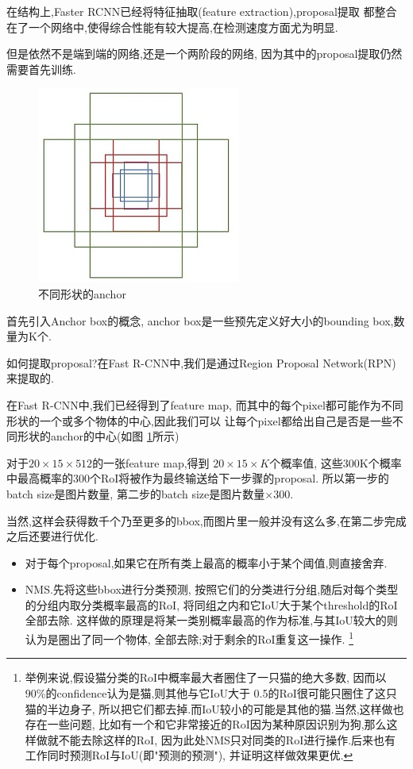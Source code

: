 在结构上,Faster RCNN已经将特征抽取(feature extraction),proposal提取
都整合在了一个网络中,使得综合性能有较大提高,在检测速度方面尤为明显.

但是依然不是端到端的网络,还是一个两阶段的网络, 因为其中的proposal提取仍然需要首先训练.

\begin{figure}[htbp]
    \centering
    \includegraphics[scale=0.7]{figures/anchor.jpg}
    \caption{不同形状的anchor}
    \label{fig:anchor}
\end{figure}

首先引入Anchor box的概念, anchor box是一些预先定义好大小的bounding box,数量为K个.

如何提取proposal?在Fast R-CNN中,我们是通过Region Proposal Network(RPN)来提取的.

在Fast R-CNN中,我们已经得到了feature map,
而其中的每个pixel都可能作为不同形状的一个或多个物体的中心,因此我们可以
让每个pixel都给出自己是否是一些不同形状的anchor的中心(如图 \ref{fig:anchor}所示)

对于$20\times 15\times 512$的一张feature map,得到 $20\times 15\times K$个概率值,
这些300K个概率中最高概率的300个RoI将被作为最终输送给下一步骤的proposal.
所以第一步的batch size是图片数量, 第二步的batch size是图片数量$\times$300.


当然,这样会获得数千个乃至更多的bbox,而图片里一般并没有这么多,在第二步完成之后还要进行优化.

\begin{itemize}
    \item 对于每个proposal,如果它在所有类上最高的概率小于某个阈值,则直接舍弃.
    \item NMS.先将这些bbox进行分类预测,
按照它们的分类进行分组,随后对每个类型的分组内取分类概率最高的RoI,
将同组之内和它IoU大于某个threshold的RoI全部去除.
这样做的原理是将某一类别概率最高的作为标准,与其IoU较大的则认为是圈出了同一个物体,
全部去除;对于剩余的RoI重复这一操作.
\footnote{举例来说,假设猫分类的RoI中概率最大者圈住了一只猫的绝大多数,
因而以90\%的confidence认为是猫,则其他与它IoU大于
0.5的RoI很可能只圈住了这只猫的半边身子,
所以把它们都去掉.而IoU较小的可能是其他的猫.当然,这样做也存在一些问题,
比如有一个和它非常接近的RoI因为某种原因识别为狗,那么这样做就不能去除这样的RoI,
因为此处NMS只对同类的RoI进行操作.后来也有工作同时预测RoI与IoU(即"预测的预测"),
并证明这样做效果更优.}
\end{itemize}

